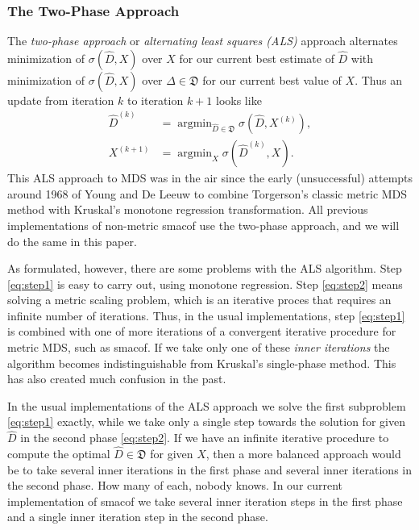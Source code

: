 \documentclass[
  12pt,
]{article}
\begin{document}
\subsubsection{The Two-Phase Approach}\label{the-two-phase-approach}

The \emph{two-phase approach} or \emph{alternating least squares (ALS)} approach
alternates minimization of \(\sigma(\hat D,X)\) over \(X\) for our current
best estimate of \(\hat D\) with minimization of \(\sigma(\hat D,X)\) over
\(\Delta\in\mathfrak{D}\) for our current best value of \(X\). Thus an
update from iteration \(k\) to iteration \(k+1\) looks like
\begin{align}
\hat D^{(k)}&=\mathop{\text{argmin}}_{\hat D\in\mathfrak{D}}\sigma(\hat D,X^{(k)}),\label{eq:step1}\\
X^{(k+1)}&=\mathop{\text{argmin}}_X\sigma(\hat D^{(k)},X).\label{eq:step2}
\end{align}
This ALS approach to MDS was in the air since the early
(unsuccessful) attempts around 1968 of Young and De Leeuw to combine
Torgerson's classic metric MDS method with Kruskal's monotone regression
transformation. All previous implementations of non-metric smacof
use the two-phase approach, and we will do the same in this paper.

As formulated, however, there are some problems with the ALS algorithm.
Step \eqref{eq:step1} is easy to carry out, using monotone regression.
Step \eqref{eq:step2} means solving a metric scaling problem, which is an
iterative proces that requires an infinite number of iterations. Thus,
in the usual implementations, step \eqref{eq:step1} is combined with one
of more iterations of a convergent iterative procedure for metric MDS,
such as smacof. If we take only one of these \emph{inner iterations} the
algorithm becomes indistinguishable from Kruskal's single-phase method.
This has also created much confusion in the past.

In the usual implementations of the ALS approach we solve the first
subproblem \eqref{eq:step1} exactly, while we take only a single step
towards the solution for given \(\hat D\) in the second phase
\eqref{eq:step2}. If we have an infinite iterative procedure to compute
the optimal \(\hat D\in\mathfrak{D}\) for given \(X\), then a more balanced
approach would be to take several inner iterations in the first phase and
several inner iterations in the second phase. How many of each, nobody
knows. In our current implementation of smacof we take several inner
iteration steps in the first phase and a single inner iteration step
in the second phase.
\end{document}
